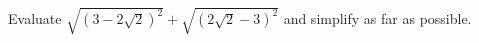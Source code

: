 Evaluate $\sqrt{\left(3-2\sqrt2\right)^2}+\sqrt{\left(2\sqrt2-3\right)^2}$ and simplify as far as possible.
